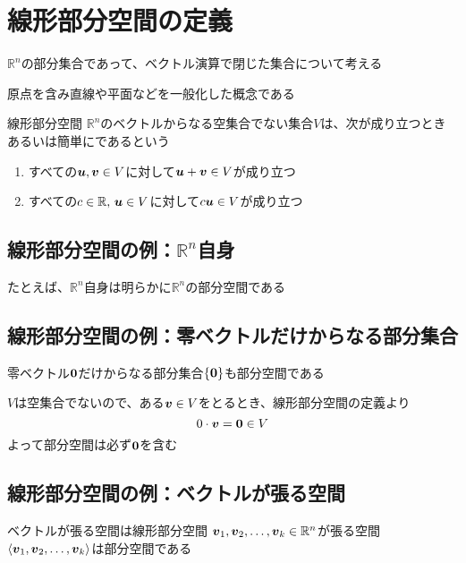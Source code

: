 \documentclass[../../../topic_linear-algebra]{subfiles}
\begin{document}
\sectionline
\section{線形部分空間の定義}

$\mathbb{R}^n$の部分集合であって、ベクトル演算で閉じた集合について考える

原点を含み直線や平面などを一般化した概念である

\begin{definition}{線形部分空間}
  $\mathbb{R}^n$のベクトルからなる空集合でない集合$V$は、次が成り立つときあるいは簡単にであるという
  \begin{enumerate}[label=\romanlabel]
    \item すべての$\vb*{u}, \vb*{v} \in V$に対して$\vb*{u} + \vb*{v} \in V$が成り立つ
    \item すべての$c \in \mathbb{R},\,\vb*{u} \in V$に対して$c \vb*{u} \in V$が成り立つ
  \end{enumerate}
\end{definition}

\subsection{線形部分空間の例：$\mathbb{R}^n$自身}

たとえば、$\mathbb{R}^n$自身は明らかに$\mathbb{R}^n$の部分空間である

\subsection{線形部分空間の例：零ベクトルだけからなる部分集合}

零ベクトル$\vb*{0}$だけからなる部分集合$\{ \vb*{0} \}$も部分空間である

\br

$V$は空集合でないので、ある$\vb*{v} \in V$をとるとき、線形部分空間の定義より
\begin{equation*}
  0 \cdot \vb*{v} = \vb*{0} \in V
\end{equation*}
よって部分空間は必ず$\vb*{0}$を含む

\subsection{線形部分空間の例：ベクトルが張る空間}

\begin{theorem}{ベクトルが張る空間は線形部分空間}
  $\vb*{v}_1, \vb*{v}_2, \dots, \vb*{v}_k \in \mathbb{R}^n$が張る空間$\langle \vb*{v}_1, \vb*{v}_2, \dots, \vb*{v}_k \rangle$は部分空間である
\end{theorem}
\end{document}
